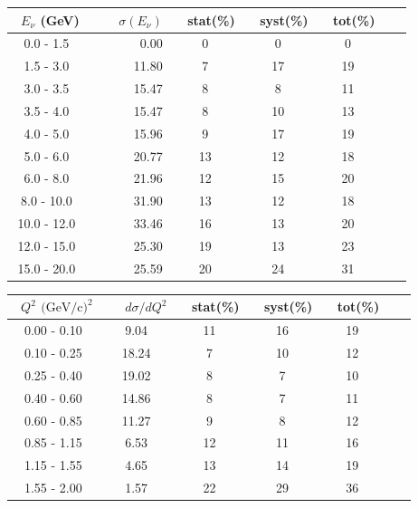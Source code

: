 \documentclass[aps, prd, reprint,showpacs,  preprintnumbers,amsmath,amssymb,superscriptaddress, nofootinbib]{revtex4-1}
\makeatletter
\renewenvironment{table}
  {\def\@captype{table}}
  {}
\makeatother
\begin{document}
\begin{table}
\centering
\begin{tabular}{crccccc}
\hline
~$E_{\nu}$ (GeV) &~~~ $\sigma (E_\nu)$ &~ stat(\%) &~ syst(\%) &~ tot(\%)  \\
\hline
     0.0 - 1.5 &   0.00 &    0 &    0 &    0 \\
     1.5 - 3.0 &  11.80 &    7 &   17 &   19 \\
     3.0 - 3.5 &  15.47 &    8 &    8 &   11 \\
     3.5 - 4.0 &  15.47 &    8 &   10 &   13 \\
     4.0 - 5.0 &  15.96 &    9 &   17 &   19 \\
     5.0 - 6.0 &  20.77 &   13 &   12 &   18 \\
     6.0 - 8.0 &  21.96 &   12 &   15 &   20 \\
    8.0 - 10.0 &  31.90 &   13 &   12 &   18 \\
   10.0 - 12.0 &  33.46 &   16 &   13 &   20 \\
   12.0 - 15.0 &  25.30 &   19 &   13 &   23 \\
   15.0 - 20.0 &  25.59 &   20 &   24 &   31 \\
\hline\hline
\end{tabular}
\caption{ Total cross section in neutrino energy $E_\nu$, $\sigma (E_\nu)(10^{-40}\text{cm}^2/\text{nucleon})$, 
for $\pi^0$+nucleon(s) production with statistical (stat), systematic (syst), and total (tot) uncertainties.}
\label{tb:sigma-Enu}
\end{table}

\newpage
\noindent

\begin{table}
\centering
\begin{tabular}{ccccccc}
\hline
~$Q^2$ $\text{(GeV/c)}^2$ &~~ $d\sigma/dQ^2$ &~ stat(\%) &~ syst(\%) &~ tot(\%)  \\
\hline
   0.00 - 0.10 &   9.04 &   11 &   16 &   19 \\
   0.10 - 0.25 &  18.24 &    7 &   10 &   12 \\
   0.25 - 0.40 &  19.02 &    8 &    7 &   10 \\
   0.40 - 0.60 &  14.86 &    8 &    7 &   11 \\
   0.60 - 0.85 &  11.27 &    9 &    8 &   12 \\
   0.85 - 1.15 &   6.53 &   12 &   11 &   16 \\
   1.15 - 1.55 &   4.65 &   13 &   14 &   19 \\
   1.55 - 2.00 &   1.57 &   22 &   29 &   36 \\
\hline\hline
\end{tabular}
\caption{ Flux-averaged differential cross section in $Q^2$, 
$d\sigma/dQ^2 (10^{-40}\text{cm}^2/\text{nucleon}/(\text{GeV/c})^2)$, 
for $\pi^0$+nucleon(s) production with statistical (stat), systematic (syst), and total (tot) uncertainties.}
\label{tb:piz-Q2}
\end{table}
\smallskip
\smallskip
\smallskip
\smallskip
\end{document}
